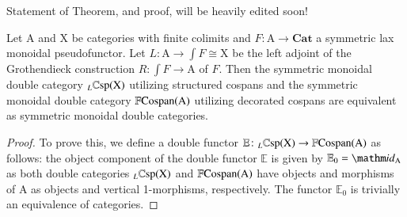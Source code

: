 \documentclass{amsart}
\begin{document}
{\chris Statement of Theorem, and proof, will be heavily edited soon!}
\begin{thm}\label{Equiv}
Let $\mathrm{A}$ and $\mathrm{X}$ be categories with finite colimits and $F \colon \mathrm{A} \to \mathbf{Cat}$ a symmetric lax monoidal pseudofunctor. Let $L \colon \mathrm{A} \to \int{F} \cong \mathrm{X}$ be the left adjoint of the Grothendieck construction $R \colon \int{F} \to \mathrm{A}$ of $F$. Then the symmetric monoidal double category $_L \mathbb{C}\textnormal{sp}(\mathrm{X})$ utilizing structured cospans and the symmetric monoidal double category $\mathbb{F}\textnormal{Cospan}(\mathrm{A})$ utilizing decorated cospans are equivalent as symmetric monoidal double categories.
\end{thm}
\begin{proof}
To prove this, we define a double functor $\mathbb{E} \colon _L \mathbb{C}\textnormal{sp}(\mathrm{X}) \to \mathbb{F}\textnormal{Cospan}(\mathrm{A})$ as follows: the object component of the double functor $\mathbb{E}$ is given by $\mathbb{E}_0 = \id_{\mathrm{A}}$ as both double categories $_L \mathbb{C}\textnormal{sp}(\mathrm{X})$ and $\mathbb{F}\textnormal{Cospan}(\mathrm{A})$ have objects and morphisms of $\mathrm{A}$ as objects and vertical 1-morphisms, respectively. The functor $\mathbb{E}_0$ is trivially an equivalence of categories.


\end{proof}
\end{document}
